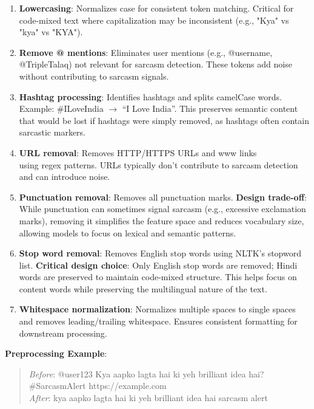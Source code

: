 \documentclass[11pt]{article}
\begin{document}
\begin{enumerate}
\item \textbf{Lowercasing}: Normalizes case for consistent token matching. Critical for code-mixed text where capitalization may be inconsistent (e.g., "Kya" vs "kya" vs "KYA").

\item \textbf{Remove @ mentions}: Eliminates user mentions (e.g., @username, @TripleTalaq) not relevant for sarcasm detection. These tokens add noise without contributing to sarcasm signals.

\item \textbf{Hashtag processing}: Identifies hashtags and splits camelCase words. Example: \#ILoveIndia $\rightarrow$ ``I Love India''. This preserves semantic content that would be lost if hashtags were simply removed, as hashtags often contain sarcastic markers.

\item \textbf{URL removal}: Removes HTTP/HTTPS URLs and www links\\ using regex patterns. URLs typically don't contribute to sarcasm detection\\ and can introduce noise.

\item \textbf{Punctuation removal}: Removes all punctuation marks. \textbf{Design trade-off}: While punctuation can sometimes signal sarcasm (e.g., excessive exclamation marks), removing it simplifies the feature space and reduces vocabulary size, allowing models to focus on lexical and semantic patterns.

\item \textbf{Stop word removal}: Removes English stop words using NLTK's stopword list. \textbf{Critical design choice}: Only English stop words are removed; Hindi words are preserved to maintain code-mixed structure. This helps focus on content words while preserving the multilingual nature of the text.

\item \textbf{Whitespace normalization}: Normalizes multiple spaces to single spaces and removes leading/trailing whitespace. Ensures consistent formatting for downstream processing.
\end{enumerate}

\textbf{Preprocessing Example}: 
\begin{quote}
\textit{Before}: @user123 Kya aapko lagta hai ki yeh brilliant idea hai? \#SarcasmAlert https://example.com\\
\textit{After}: kya aapko lagta hai ki yeh brilliant idea hai sarcasm alert
\end{quote}
\end{document}
